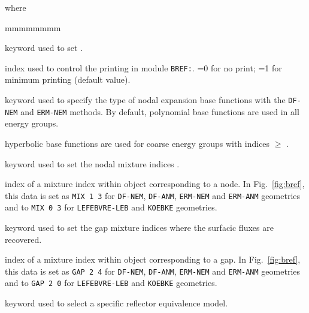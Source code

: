 \noindent where
\begin{ListeDeDescription}{mmmmmmmm}

\item[\moc{EDIT}] keyword used to set .

\item[\dusa{iprint}] index used to control the printing in module {\tt BREF:}. =0 for no print; =1 for minimum printing (default value).

\item[\moc{HYPE}] keyword used to specify the type of nodal expansion base functions with the {\tt DF-NEM} and {\tt ERM-NEM}
methods. By default, polynomial base functions are used in all energy groups.

\item[\dusa{igmax}] hyperbolic base functions are used for coarse energy groups with indices $\ge$ .

\item[\moc{MIX}] keyword used to set the nodal mixture indices .

\item[\dusa{imix}] index of a mixture index within object  corresponding to a node. In Fig.~\ref{fig:bref}, this data
is set as {\tt MIX 1 3} for {\tt DF-NEM}, {\tt DF-ANM}, {\tt ERM-NEM} and {\tt ERM-ANM} geometries and to {\tt MIX 0 3} for {\tt LEFEBVRE-LEB} and {\tt KOEBKE}
geometries.

\item[\moc{GAP}] keyword used to set the gap mixture indices  where the surfacic fluxes are recovered.

\item[\dusa{igap}] index of a mixture index within object  corresponding to a gap. In Fig.~\ref{fig:bref}, this data
is set as {\tt GAP 2 4} for {\tt DF-NEM}, {\tt DF-ANM}, {\tt ERM-NEM} and {\tt ERM-ANM} geometries and to {\tt GAP 2 0} for {\tt LEFEBVRE-LEB} and {\tt KOEBKE}
geometries.

\item[\moc{MODE}] keyword used to select a specific reflector equivalence model.


\end{ListeDeDescription}
